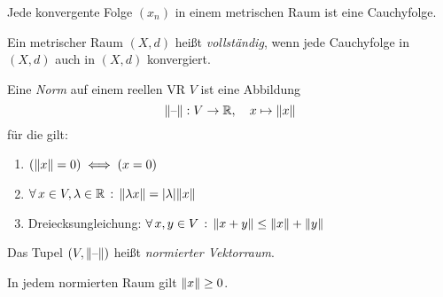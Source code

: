 \documentclass{cheat-sheet}
\begin{document}
\begin{satz}
  Jede konvergente Folge $(x_n)$ in einem metrischen Raum ist eine Cauchyfolge.
\end{satz}

\begin{defn}
  Ein metrischer Raum $(X, d)$ heißt \emph{vollständig}, wenn jede Cauchyfolge in $(X, d)$ auch in $(X, d)$ konvergiert.
\end{defn}


\begin{defn}
  Eine \emph{Norm} auf einem reellen VR $V$ ist eine Abbildung
  \[
    \lVert\text{--}\rVert : V \to \mathbb{R}, \quad
    x \mapsto \lVert x\rVert
  \]
  für die gilt:
  \begin{enumerate}
    \item $(\lVert x\rVert = 0) \iff (x = 0)$
    \item $\forall \, {x \in V, \lambda \in \mathbb{R}} \,:\, \lVert\lambda x\rVert = \lvert\lambda\rvert \lVert x\rVert$
    \item Dreiecksungleichung: $\forall \, {x, y \in V} \,:\, \lVert x + y\rVert \le \lVert x\rVert + \lVert y\rVert$
  \end{enumerate}
  Das Tupel $(V, \lVert\text{--}\rVert)$ heißt \emph{normierter Vektorraum}.
\end{defn}

\begin{bem}
  In jedem normierten Raum gilt $\lVert x\rVert \ge 0$.
\end{bem}
\end{document}

